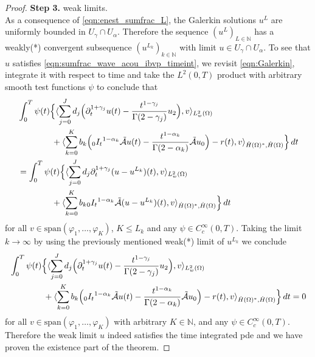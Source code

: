\begin{proof}
\noindent
{\bf Step 3.} weak limits.\\
As a consequence of \eqref{eqn:enest_sumfrac_L}, the Galerkin solutions $u^L$ are uniformly bounded in $U_\gamma\cap U_\alpha$. Therefore the sequence $(u^L)_{L\in\mathbb{N}}$ has a weakly(*) convergent subsequence $(u^{L_k})_{k\in\mathbb{N}}$ with limit $u\in U_\gamma\cap U_\alpha$.
To see that $u$ satisfies \eqref{eqn:sumfrac_wave_acou_ibvp_timeint}, we revisit \eqref{eqn:Galerkin}, integrate it with respect to time and take the $L^2(0,T)$ product with arbitrary smooth test functions $\psi$ to conclude that  
\[
\begin{aligned}
&\int_0^T\psi(t)\Bigl\{\langle \sum_{j=0}^J d_j \Bigl(\partial_t^{1+\gamma_j} u(t)-\frac{t^{1-\gamma_j}}{\Gamma(2-\gamma_j)}u_2\Bigr),v\rangle_{L^2_w(\Omega)} \\
&\qquad\qquad+ \langle\sum_{k=0}^K b_k \Bigl({_0I_t}^{1-\alpha_k} \tilde{\mathcal{A}} u(t) - \frac{t^{1-\alpha_k}}{\Gamma(2-\alpha_k)}\tilde{\mathcal{A}} u_0\Bigr) - r(t),v\rangle_{\dot{H}(\Omega)^*,\dot{H}(\Omega)}\Bigr\}\, dt \\
&= \int_0^T\psi(t)\Bigl\{\langle \sum_{j=0}^J d_j \partial_t^{1+\gamma_j} (u-u^{L_k})(t),v\rangle_{L^2_w(\Omega)}\\ 
&\qquad\qquad + \langle\sum_{k=0}^K b_k {_0I_t}^{1-\alpha_k} \tilde{\mathcal{A}} (u-u^{L_k})(t),v\rangle_{\dot{H}(\Omega)^*,\dot{H}(\Omega)}\Bigr\}\, dt  
\end{aligned}
\]
for all $v\in \mbox{span}(\varphi_1,\ldots, \varphi_K)$, $K\leq L_k$ and any $\psi\in C_c^\infty(0,T)$. Taking the limit $k\to\infty$ by using the previously mentioned weak(*) limit of $u^{L_k}$ 
we conclude 
\[
\begin{aligned}
&\int_0^T\psi(t)\Bigl\{\langle \sum_{j=0}^J d_j \Bigl(\partial_t^{1+\gamma_j} u(t)-\frac{t^{1-\gamma_j}}{\Gamma(2-\gamma_j)}u_2\Bigr),v\rangle_{L^2_w(\Omega)} \\
&\qquad\qquad+ \langle\sum_{k=0}^K b_k \Bigl({_0I_t}^{1-\alpha_k} \tilde{\mathcal{A}} u(t) - \frac{t^{1-\alpha_k}}{\Gamma(2-\alpha_k)}\tilde{\mathcal{A}} u_0\Bigr) - r(t),v\rangle_{\dot{H}(\Omega)^*,\dot{H}(\Omega)}\Bigr\}\, dt 
=0
\end{aligned}
\]
for all $v\in \mbox{span}(\varphi_1,\ldots, \varphi_K)$ with arbitrary $K\in\mathbb{N}$, and any $\psi\in C_c^\infty(0,T)$. 
Therefore the weak limit $u$ indeed satisfies the time integrated {\sc pde} and we have proven the existence part of the theorem. 


\end{proof}
